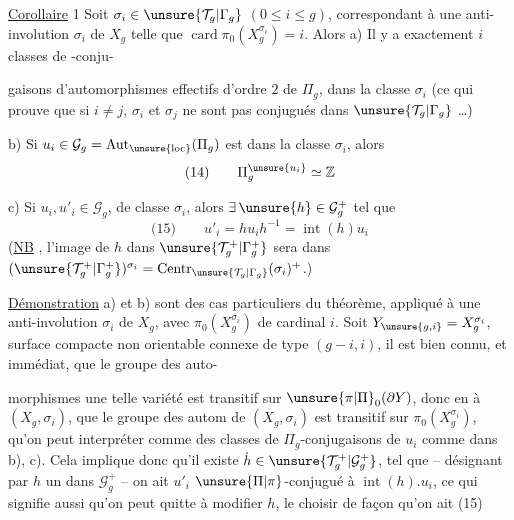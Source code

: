\uline{Corollaire} 1 Soit $\sigma_i\in\unsure{\mathcal{T}_g|\Gamma_g}$ $(0\leq i\leq g)$,
correspondant à une anti-involution $\sigma_i$ de
$X_g$ telle que $\operatorname{card}\pi_0(X_g^{\sigma_i})=i$. Alors
a) Il y a exactement $i$ classes de -conju-

gaisons d'automorphismes effectifs d'ordre $2$
de $\Pi_g$, dans la classe $\sigma_i$ (ce qui prouve
que si $i\neq j$, $\sigma_i$ et $\sigma_j$ ne sont pas
conjugués dans $\unsure{\mathcal{T}_g|\Gamma_g}$  \dots)

b) Si $u_i\in\mathcal{G}_g=\operatorname{Aut}_{\unsure{\mathrm{loc}}}(\Pi_g)$ est  dans la
classe $\sigma_i$, alors 
\[
\text{(14)}\qquad \Pi_g^{\unsure{u_i}}\simeq\mathbb{Z}
\]

c) Si $u_i,u'_i\in\mathcal{G}_g$, 
 de classe $\sigma_i$, alors $\exists\,\unsure{h}\in\mathcal{G}_g^+$
tel que
\[
\text{(15)}\qquad u'_i=hu_ih^{-1}=\operatorname{int}(h)u_i
\]
(\uline{NB} , l'image de $h$ dans $\unsure{\mathcal{T}_g^+|\Gamma_g^+}$
sera dans $(\unsure{\mathcal{T}_g^+|\Gamma_g^+})^{\sigma_i}=\operatorname{Centr}_{\unsure{\mathcal{T}_g|\Gamma_g}}(\sigma_i)^+$.)

\uline{Démonstration} a) et b) sont des cas
particuliers du théorème, appliqué à
une anti-involution $\sigma_i$ de $X_g$, avec
$\pi_0(X_g^{\sigma_i})$ de cardinal $i$. Soit $Y_{\unsure{g,i}}=X_g^{\sigma_i}$,
surface compacte  non orientable  connexe
de type $(g-i,i)$, il est bien connu,
et immédiat, que le groupe des auto-

morphismes  une telle variété est transitif
sur $\unsure{\pi|\Pi}_0(\partial Y)$, donc en  à $(X_g,\sigma_i)$, que
le groupe des autom de $(X_g,\sigma_i)$ est transitif
sur $\pi_0(X_g^{\sigma_i})$,  qu'on peut interpréter
 comme  des classes de $\Pi_g$-conjugaisons
de $u_i$ comme dans b), c). Cela
implique donc qu'il existe $\dot{h}\in\unsure{\mathcal{T}_g^+|\mathcal{G}_g^+}$,  tel que
-- désignant par $h$ un  dans $\mathcal{G}_g^+$ --
on ait $u'_i$ $\unsure{\Pi|\pi}$-conjugué à $\operatorname{int}(h).u_i$, ce
qui signifie aussi qu'on peut quitte à modifier
$h$, le choisir de façon qu'on ait (15)


